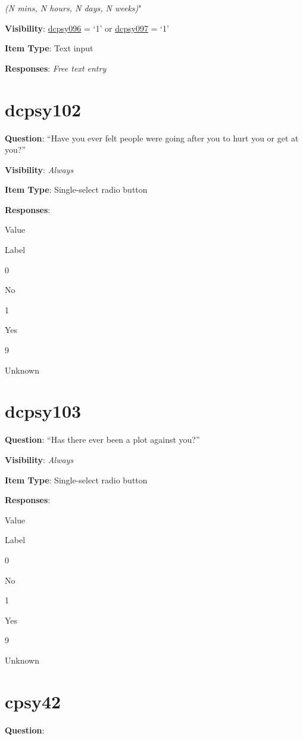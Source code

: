 \documentclass[]{book}
\begin{document}
\emph{(N mins, N hours, N days, N weeks)}"

\textbf{Visibility}: \protect\hyperlink{dcpsy096}{dcpsy096} = `1' or \protect\hyperlink{dcpsy097}{dcpsy097} = `1'

\textbf{Item Type}: Text input

\textbf{Responses}: \emph{Free text entry}

\hypertarget{dcpsy102}{%
\section{dcpsy102}\label{dcpsy102}}

\textbf{Question}: ``Have you ever felt people were going after you to hurt you or get at you?''

\textbf{Visibility}: \emph{Always}

\textbf{Item Type}: Single-select radio button

\textbf{Responses}:

Value

Label

0

No

1

Yes

9

Unknown

\hypertarget{dcpsy103}{%
\section{dcpsy103}\label{dcpsy103}}

\textbf{Question}: ``Has there ever been a plot against you?''

\textbf{Visibility}: \emph{Always}

\textbf{Item Type}: Single-select radio button

\textbf{Responses}:

Value

Label

0

No

1

Yes

9

Unknown

\hypertarget{cpsy42}{%
\section{cpsy42}\label{cpsy42}}

\textbf{Question}:
\end{document}

